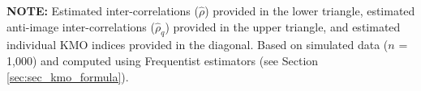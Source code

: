 \documentclass[
  10pt,
  a4paper,
  twoside]{article}
\begin{document}
\noindent
\fontsize{8pt}{10pt}\selectfont
\textbf{NOTE:} Estimated inter-correlations (\(\hat{\rho}\)) provided in the lower triangle, estimated anti-image inter-correlations (\(\hat{\rho}_q\)) provided in the upper triangle, and estimated individual KMO indices provided in the diagonal. Based on simulated data (\(n\) = 1,000) and computed using Frequentist estimators (see Section \ref{sec:sec_kmo_formula}).
\endgroup
\vspace{1em}
\end{document}
